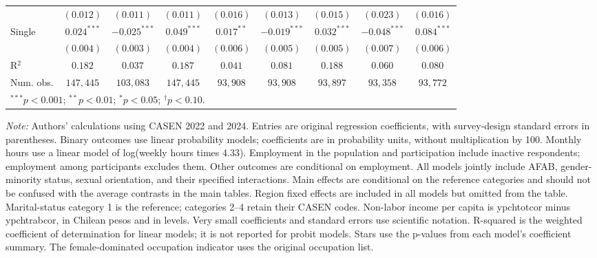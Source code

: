 \begin{table}[htpb]
{\begin{tabular}{l c c c c c c c c}
 & $(0.012)$ & $(0.011)$ & $(0.011)$ & $(0.016)$ & $(0.013)$ & $(0.015)$ & $(0.023)$ & $(0.016)$ \\
Single & $0.024^{***}$ & $-0.025^{***}$ & $0.049^{***}$ & $0.017^{**}$ & $-0.019^{***}$ & $0.032^{***}$ & $-0.048^{***}$ & $0.084^{***}$ \\
 & $(0.004)$ & $(0.003)$ & $(0.004)$ & $(0.006)$ & $(0.005)$ & $(0.005)$ & $(0.007)$ & $(0.006)$ \\
\hline
R$^2$ & $0.182$ & $0.037$ & $0.187$ & $0.041$ & $0.081$ & $0.188$ & $0.060$ & $0.080$ \\
Num. obs. & $147,445$ & $103,083$ & $147,445$ & $93,908$ & $93,908$ & $93,897$ & $93,358$ & $93,772$ \\
\hline
\multicolumn{9}{l}{\scriptsize $^{***}p<0.001$; $^{**}p<0.01$; $^{*}p<0.05$; $^{\dagger}p<0.10$.} \\
\end{tabular}%
}
\par\smallskip
\begin{minipage}{\textwidth}\footnotesize\raggedright
\textit{Note:} Authors' calculations using CASEN 2022 and 2024. Entries are original regression coefficients, with survey-design standard errors in parentheses. Binary outcomes use linear probability models; coefficients are in probability units, without multiplication by 100. Monthly hours use a linear model of log(weekly hours times 4.33). Employment in the population and participation include inactive respondents; employment among participants excludes them. Other outcomes are conditional on employment. All models jointly include AFAB, gender-minority status, sexual orientation, and their specified interactions. Main effects are conditional on the reference categories and should not be confused with the average contrasts in the main tables. Region fixed effects are included in all models but omitted from the table. Marital-status category 1 is the reference; categories 2--4 retain their CASEN codes. Non-labor income per capita is ypchtotcor minus ypchtrabcor, in Chilean pesos and in levels. Very small coefficients and standard errors use scientific notation. R-squared is the weighted coefficient of determination for linear models; it is not reported for probit models. Stars use the p-values from each model's coefficient summary. The female-dominated occupation indicator uses the original occupation list.
\end{minipage}
\end{table}
